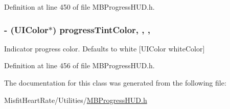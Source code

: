 Definition at line 450 of file M\+B\+Progress\+H\+U\+D.\+h.

\hypertarget{interface_m_b_round_progress_view_ae5c8d76a85810a3f843f262bdfff1163}{
\subsubsection[{progress\+Tint\+Color}]{\setlength{\rightskip}{0pt plus 5cm}-\/ (U\+I\+Color$\ast$) progress\+Tint\+Color\hspace{0.3cm}{\ttfamily [read]}, {\ttfamily [write]}, {\ttfamily [nonatomic]}, {\ttfamily [assign]}}}\label{interface_m_b_round_progress_view_ae5c8d76a85810a3f843f262bdfff1163}
Indicator progress color. Defaults to white \mbox{[}U\+I\+Color white\+Color\mbox{]} 

Definition at line 456 of file M\+B\+Progress\+H\+U\+D.\+h.



The documentation for this class was generated from the following file\+:\begin{DoxyCompactItemize}
\item 
Misfit\+Heart\+Rate/\+Utilities/\hyperlink{_m_b_progress_h_u_d_8h}{M\+B\+Progress\+H\+U\+D.\+h}\end{DoxyCompactItemize}
